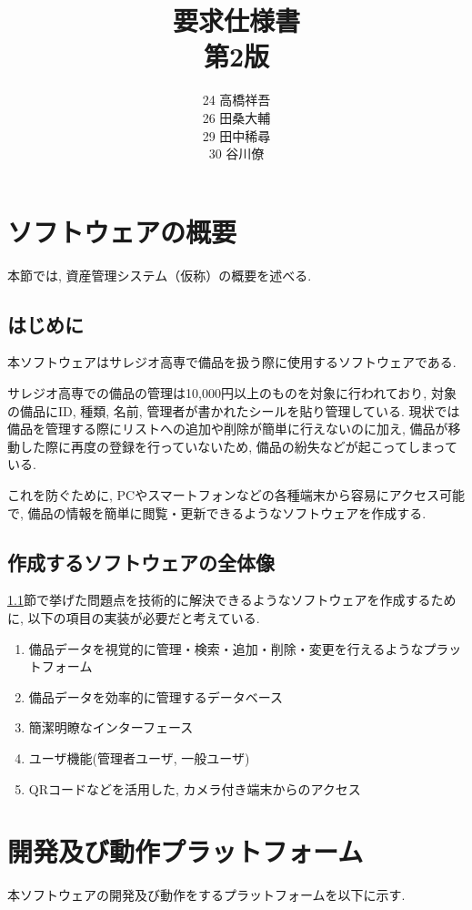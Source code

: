 \documentclass[11ptm]{jsarticle}
\title{{\Huge 要求仕様書}\\第2版}
\author{24 高橋祥吾\\26 田桑大輔\\29 田中稀尋\\30 谷川僚}
\date{}
\begin{document}
\maketitle
\clearpage

\tableofcontents
\clearpage

\section{ソフトウェアの概要}
\label{sec:ソフトウェアの概要}
本節では, 資産管理システム（仮称）の概要を述べる.

\subsection{はじめに}
\label{subsec:はじめに}
本ソフトウェアはサレジオ高専で備品を扱う際に使用するソフトウェアである. \par
サレジオ高専での備品の管理は10,000円以上のものを対象に行われており, 対象の備品にID, 種類, 名前, 管理者が書かれたシールを貼り管理している. 現状では備品を管理する際にリストへの追加や削除が簡単に行えないのに加え, 備品が移動した際に再度の登録を行っていないため, 備品の紛失などが起こってしまっている.\par
これを防ぐために, PCやスマートフォンなどの各種端末から容易にアクセス可能で, 備品の情報を簡単に閲覧・更新できるようなソフトウェアを作成する.

\subsection{作成するソフトウェアの全体像}
\label{subsec:作成するソフトウェアの全体像}
\ref{subsec:はじめに}節で挙げた問題点を技術的に解決できるようなソフトウェアを作成するために, 以下の項目の実装が必要だと考えている.
\begin{enumerate}
  \item 備品データを視覚的に管理・検索・追加・削除・変更を行えるようなプラットフォーム
  \item 備品データを効率的に管理するデータベース
  \item 簡潔明瞭なインターフェース
  \item ユーザ機能(管理者ユーザ, 一般ユーザ)
  \item QRコードなどを活用した, カメラ付き端末からのアクセス
\end{enumerate}


\newpage
\section{開発及び動作プラットフォーム}
\label{sec:開発及び動作プラットフォーム}
本ソフトウェアの開発及び動作をするプラットフォームを以下に示す.
\end{document}
